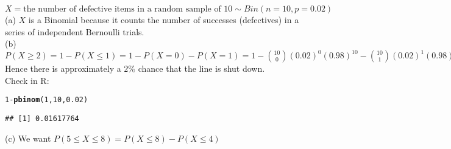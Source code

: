 \documentclass[bigtut]{tutorial}\usepackage[]{graphicx}\usepackage[]{color}
\makeatletter
\newcommand{\hlnum}[1]{\textcolor[rgb]{0.686,0.059,0.569}{#1}}%
\newcommand{\hlopt}[1]{\textcolor[rgb]{0,0,0}{#1}}%
\newcommand{\hlstd}[1]{\textcolor[rgb]{0.345,0.345,0.345}{#1}}%
\newcommand{\hlkwd}[1]{\textcolor[rgb]{0.737,0.353,0.396}{\textbf{#1}}}%
\newenvironment{kframe}{%
 \def\at@end@of@kframe{}%
 \ifinner\ifhmode%
  \def\at@end@of@kframe{\end{minipage}}%
  \begin{minipage}{\columnwidth}%
 \fi\fi%
 \def\FrameCommand##1{\hskip\@totalleftmargin \hskip-\fboxsep
 \colorbox{shadecolor}{##1}\hskip-\fboxsep
     \hskip-\linewidth \hskip-\@totalleftmargin \hskip\columnwidth}%
 \MakeFramed {\advance\hsize-\width
   \@totalleftmargin\z@ \linewidth\hsize
   \@setminipage}}%
 {\par\unskip\endMakeFramed%
 \at@end@of@kframe}
\newenvironment{knitrout}{}{} %
\makeatother
\begin{document}
\begin{tutorial}
\begin{questions}


\begin{solution}
$X = \text{the number of defective
items in a random sample of 10} \sim Bin(n=10,p=0.02)$ \\

(a) 
$X$ is a Binomial because it counts the number of successes (defectives) in a series of independent Bernoulli trials.  \\

(b)
$P(X \geq 2) = 1 - P(X \leq 1) = 1 - P(X=0) - P(X=1) = 1 - {10 \choose 0} (0.02)^{0} (0.98)^{10} - {10 \choose 1} (0.02)^1 (0.98)^{9} = 0.01617764$ \\

Hence there is approximately a $2 \%$ chance that the line is shut down. \\

Check in R: 
\begin{knitrout}
\color{fgcolor}\begin{kframe}
\begin{alltt}
\hlnum{1}\hlopt{-}\hlkwd{pbinom}\hlstd{(}\hlnum{1}\hlstd{,}\hlnum{10}\hlstd{,}\hlnum{0.02}\hlstd{)}
\end{alltt}
\begin{verbatim}
## [1] 0.01617764
\end{verbatim}
\end{kframe}
\end{knitrout}

\vspace{.5cm}
(c) 
We want
$P( 5 \leq X \leq 8) = P(X \leq 8) - P(X \leq 4)$ \\


\end{solution}
\end{questions}
\end{tutorial}
\end{document}
